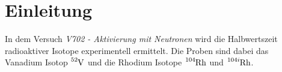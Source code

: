 \section{Einleitung}
\label{sec:einleitung}
In dem Versuch \textit{V702 - Aktivierung mit Neutronen} wird die Halbwertszeit radioaktiver Isotope
experimentell ermittelt. Die Proben sind dabei das Vanadium Isotop $\ce{^{52}V}$ und die Rhodium Isotope
$\ce{^{104}Rh}$ und $\ce{^{104i}Rh}$. 